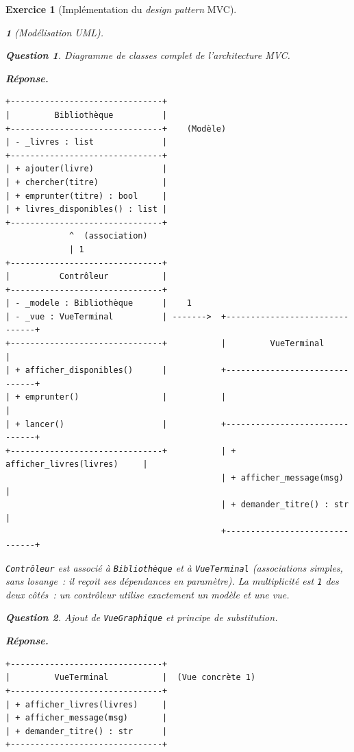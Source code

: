 \documentclass{article}
\theoremstyle{exostyle}
\newtheorem{exo}{Exercice}
\theoremstyle{partiestyle}
\newtheorem{partie}{}[exo]
\theoremstyle{questionstyle}
\newtheorem{questionpartie}{Question}[partie]
\newenvironment{reponse}{%
    \par\smallskip\noindent\textbf{Réponse.}\enspace\ignorespaces
}{%
    \par\smallskip
}
\begin{document}
\begin{exo}[Implémentation du \textit{design pattern} MVC]
\begin{partie}[Modélisation UML]
        \begin{questionpartie}
            Diagramme de classes complet de l'architecture MVC.
        \end{questionpartie}
        \begin{reponse}
\begin{verbatim}
+-------------------------------+
|         Bibliothèque          |
+-------------------------------+    (Modèle)
| - _livres : list              |
+-------------------------------+
| + ajouter(livre)              |
| + chercher(titre)             |
| + emprunter(titre) : bool     |
| + livres_disponibles() : list |
+-------------------------------+
             ^  (association)
             | 1
+-------------------------------+
|          Contrôleur           |
+-------------------------------+
| - _modele : Bibliothèque      |    1
| - _vue : VueTerminal          | ------->  +-------------------------------+
+-------------------------------+           |         VueTerminal           |
| + afficher_disponibles()      |           +-------------------------------+
| + emprunter()                 |           |                               |
| + lancer()                    |           +-------------------------------+
+-------------------------------+           | + afficher_livres(livres)     |
                                            | + afficher_message(msg)       |
                                            | + demander_titre() : str      |
                                            +-------------------------------+
\end{verbatim}
            \texttt{Contrôleur} est associé à \texttt{Bibliothèque} et à \texttt{VueTerminal} (associations simples, sans losange~: il reçoit ses dépendances en paramètre). La multiplicité est \texttt{1} des deux côtés~: un contrôleur utilise exactement un modèle et une vue.
        \end{reponse}

        \begin{questionpartie}
            Ajout de \texttt{VueGraphique} et principe de substitution.
        \end{questionpartie}
        \begin{reponse}
\begin{verbatim}
+-------------------------------+
|         VueTerminal           |  (Vue concrète 1)
+-------------------------------+
| + afficher_livres(livres)     |
| + afficher_message(msg)       |
| + demander_titre() : str      |
+-------------------------------+


\end{verbatim}
\end{reponse}
\end{partie}
\end{exo}
\end{document}

